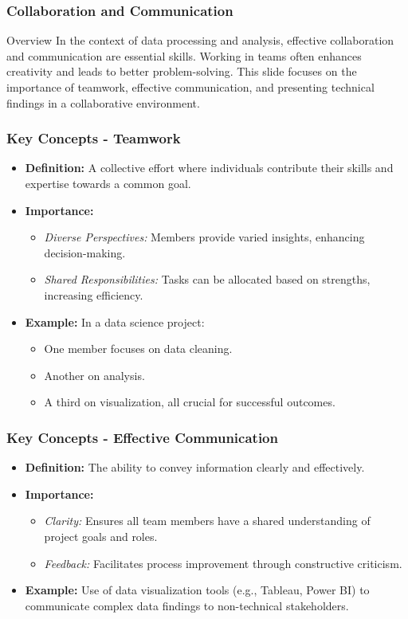 \documentclass[aspectratio=169]{beamer}
\begin{document}
\begin{frame}[fragile]
    \frametitle{Collaboration and Communication}
    \begin{block}{Overview}
        In the context of data processing and analysis, effective collaboration and communication are essential skills. 
        Working in teams often enhances creativity and leads to better problem-solving.
        This slide focuses on the importance of teamwork, effective communication, and presenting technical findings in a collaborative environment.
    \end{block}
\end{frame}

\begin{frame}[fragile]
    \frametitle{Key Concepts - Teamwork}
    \begin{itemize}
        \item \textbf{Definition:} A collective effort where individuals contribute their skills and expertise towards a common goal.
        \item \textbf{Importance:} 
        \begin{itemize}
            \item \textit{Diverse Perspectives:} Members provide varied insights, enhancing decision-making.
            \item \textit{Shared Responsibilities:} Tasks can be allocated based on strengths, increasing efficiency.
        \end{itemize}
        \item \textbf{Example:} In a data science project:
        \begin{itemize}
            \item One member focuses on data cleaning.
            \item Another on analysis.
            \item A third on visualization, all crucial for successful outcomes.
        \end{itemize}
    \end{itemize}
\end{frame}

\begin{frame}[fragile]
    \frametitle{Key Concepts - Effective Communication}
    \begin{itemize}
        \item \textbf{Definition:} The ability to convey information clearly and effectively.
        \item \textbf{Importance:}
        \begin{itemize}
            \item \textit{Clarity:} Ensures all team members have a shared understanding of project goals and roles.
            \item \textit{Feedback:} Facilitates process improvement through constructive criticism.
        \end{itemize}
        \item \textbf{Example:} Use of data visualization tools (e.g., Tableau, Power BI) to communicate complex data findings to non-technical stakeholders.
    \end{itemize}
\end{frame}
\end{document}
